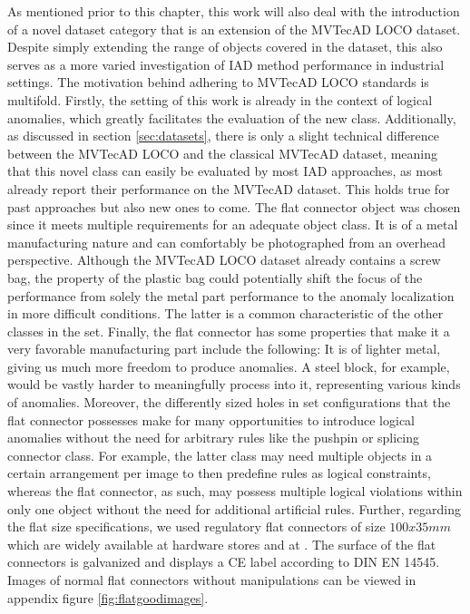 As mentioned prior to this chapter, this work will also deal with the introduction of a novel dataset category that is an extension of the MVTecAD LOCO \cite{LOCODentsAndScratchesBergmann2022} dataset. 
Despite simply extending the range of objects covered in the dataset, this also serves as a more varied investigation of IAD method performance in industrial settings. The motivation behind adhering 
to MVTecAD LOCO standards is multifold. Firstly, the setting of this work is already in the context of logical anomalies, which greatly facilitates the evaluation of the new class. Additionally, as 
discussed in section \ref{sec:datasets}, there is only a slight technical difference between the MVTecAD LOCO and the classical MVTecAD \cite{MVTEC_Bergmann_2021} dataset, meaning that this novel 
class can easily be evaluated by most IAD approaches, as most already report their performance on the MVTecAD dataset. This holds true for past approaches but also new ones 
to come.
\newline\newline
The flat connector object was chosen since it meets multiple requirements for an adequate object class. It is of a metal manufacturing nature and can comfortably be photographed from 
an overhead perspective. Although the MVTecAD LOCO dataset already contains a screw bag, the property of the plastic bag could potentially shift the focus of the performance from solely the metal 
part performance to the anomaly localization in more difficult conditions. The latter is a common characteristic of the other classes in the set. Finally, the flat connector has some 
properties that make it a very favorable manufacturing part include the following: It is of lighter metal, giving us much more freedom to produce anomalies. A steel block, for example, would be vastly 
harder to meaningfully process into it, representing various kinds of anomalies. Moreover, the differently sized holes in set configurations that the flat connector possesses make for many opportunities 
to introduce logical anomalies without the need for arbitrary rules like the pushpin or splicing connector class. For example, the latter class may need multiple objects in a certain arrangement per image to then predefine 
rules as logical constraints, whereas the flat connector, as such, may possess multiple logical violations within only one object without the need for additional artificial rules.
\newline
Further, regarding the flat size specifications, we used regulatory flat 
connectors of size $100x35 mm$ which are widely available at hardware stores and at \cite{flatconnectorlink}. The surface of the flat connectors is galvanized 
and displays a CE label according to DIN EN 14545. Images of normal flat connectors without manipulations can be viewed in appendix figure \ref{fig:flatgoodimages}.


